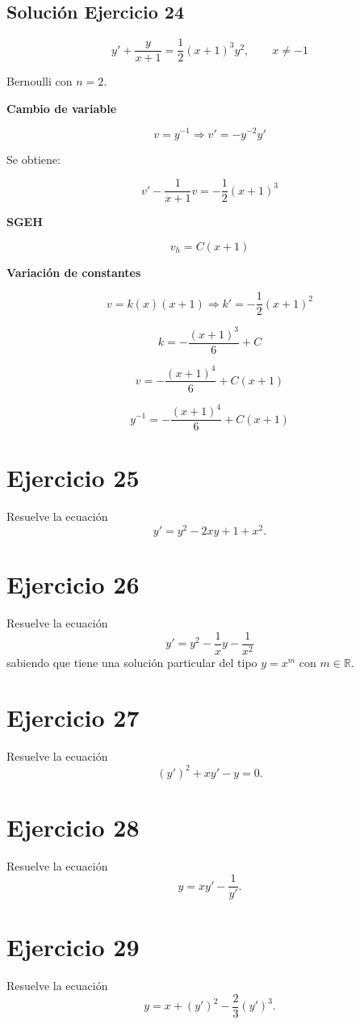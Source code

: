 \documentclass[12pt]{article}
\begin{document}
\subsection*{Solución Ejercicio 24}

\[
y' + \frac{y}{x+1} = \frac{1}{2}(x+1)^3 y^2,
\qquad x \neq -1
\]

Bernoulli con \(n=2\).

\textbf{Cambio de variable}

\[
v = y^{-1}
\Rightarrow
v' = -y^{-2}y'
\]

Se obtiene:

\[
v' - \frac{1}{x+1}v
= -\frac{1}{2}(x+1)^3
\]

\textbf{SGEH}

\[
v_h = C(x+1)
\]

\textbf{Variación de constantes}

\[
v = k(x)(x+1)
\Rightarrow
k' = -\frac{1}{2}(x+1)^2
\]

\[
k = -\frac{(x+1)^3}{6} + C
\]

\[
v = -\frac{(x+1)^4}{6} + C(x+1)
\]

\[
\boxed{y^{-1} = -\frac{(x+1)^4}{6} + C(x+1)}
\]

\section*{Ejercicio 25}
Resuelve la ecuación
\[
y' = y^2 - 2xy + 1 + x^2.
\]

\section*{Ejercicio 26}
Resuelve la ecuación
\[
y' = y^2 - \dfrac{1}{x}y - \dfrac{1}{x^2}
\]
sabiendo que tiene una solución particular del tipo $y = x^m$ con $m \in \mathbb{R}$.

\section*{Ejercicio 27}
Resuelve la ecuación
\[
(y')^2 + x y' - y = 0.
\]

\section*{Ejercicio 28}
Resuelve la ecuación
\[
y = x y' - \dfrac{1}{y'}.
\]

\section*{Ejercicio 29}
Resuelve la ecuación
\[
y = x + (y')^2 - \dfrac{2}{3}(y')^3.
\]
\end{document}

